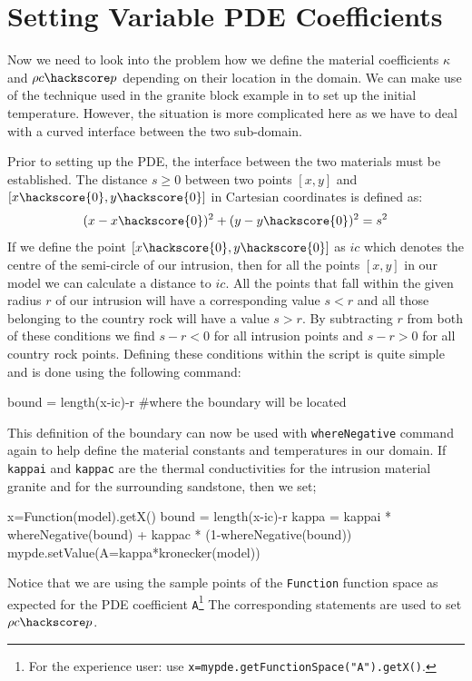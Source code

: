 \section{Setting Variable PDE Coefficients}
Now we need to look into the problem how we define the material coefficients
$\kappa$ and $\rho c\hackscore p$ depending on their location in the domain. 
We can make use of the technique used in the granite block example in 
to set up the initial temperature. However,
the situation is more complicated here as we have to deal with a
curved interface between the two sub-domain.

Prior to setting up the PDE, the interface between the two materials must be established. 
The distance $s\ge 0$ between two points $[x,y]$ and $[x\hackscore{0},y\hackscore{0}]$ in Cartesian coordinates is defined as:
\begin{equation}
 (x-x\hackscore{0})^{2}+(y-y\hackscore{0})^{2} = s^{2}
\end{equation}
If we define the point $[x\hackscore{0},y\hackscore{0}]$ as $ic$ which denotes the centre of the semi-circle of our intrusion, then for all the points $[x,y]$ in our model we can calculate a distance to $ic$. 
All the points that fall within the given radius $r$ of our intrusion will have a corresponding 
value $s < r$ and all those belonging to the country rock will have a value $s > r$. By subtracting $r$ from both of these conditions we find $s-r < 0$ for all intrusion points and $s-r > 0$ 
for all country rock points. 
Defining these conditions within the script is quite simple and is done using the following command:
\begin{python}
 bound = length(x-ic)-r #where the boundary will be located
\end{python}
This definition of the boundary can now be used with \verb|whereNegative| command again to help define the material constants and temperatures in our domain. 
If \verb|kappai| and \verb|kappac| are the 
thermal conductivities for the intrusion material granite and for the surrounding sandstone, then we set; 
\begin{python}
x=Function(model).getX()
bound = length(x-ic)-r
kappa = kappai * whereNegative(bound) + kappac * (1-whereNegative(bound))
mypde.setValue(A=kappa*kronecker(model))
\end{python}
Notice that we are using the sample points of the \verb|Function| function space as expected for the 
PDE coefficient \verb|A|\footnote{For the experience user: use \texttt{x=mypde.getFunctionSpace("A").getX()}.}
The corresponding statements are used to set $\rho c\hackscore p$. 

